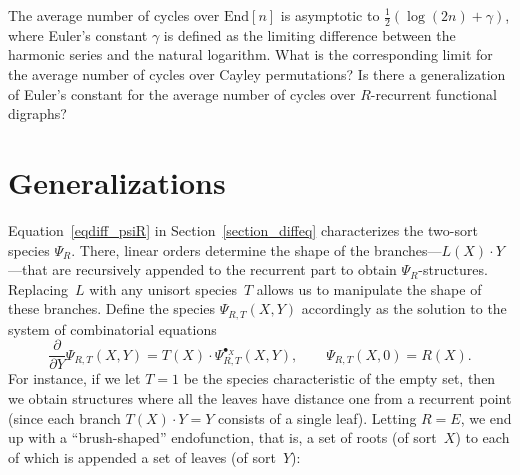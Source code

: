 \documentclass[a4paper,11pt,UKenglish]{article}
\newcommand{\Set}{E}
\newcommand{\Lin}{L}
\newcommand{\End}{\mathrm{End}}
\newcommand{\ddy}[1]{\displaystyle{\frac{\partial{#1}}{\partial Y}}}
\newcommand{\pointX}{^{\bullet_X}}
\newcommand{\Har}[1]{H_{#1}}
\theoremstyle{definition}
\begin{document}
The average number of cycles over $\End[n]$ is asymptotic to
$\frac{1}{2}(\log (2n)+\gamma)$, where Euler's constant $\gamma$
is defined as the limiting difference between the harmonic series
and the natural logarithm.
What is the corresponding limit for the average number of cycles
over Cayley permutations? Is there a generalization of Euler's
constant for the average number of cycles over $R$-recurrent
functional digraphs?

\section{Generalizations}\label{section_generalizations}

Equation~\eqref{eqdiff_psiR} in Section~\ref{section_diffeq}
characterizes the two-sort species $\Psi_R$.
There, linear orders determine the shape of the
branches---$\Lin(X)\cdot Y$---that are recursively appended to the
recurrent part to obtain $\Psi_R$-structures.
Replacing~$\Lin$ with any unisort species~$T$ allows us to manipulate
the shape of these branches. Define the species $\Psi_{R,T}(X,Y)$
accordingly as the solution to the system of combinatorial equations
\[
  \ddy{}\Psi_{R,T}(X,Y) = T(X)\cdot\Psi_{R,T}\pointX(X,Y),\qquad \Psi_{R,T}(X,0)=R(X).
\]
For instance, if we let $T=1$ be the species characteristic of the empty set, then we obtain structures where
all the leaves have distance one from a recurrent point (since each
branch $T(X)\cdot Y=Y$ consists of a single leaf).
Letting $R=\Set$, we end up with a ``brush-shaped'' endofunction,
that is, a set of roots (of sort~$X$) to each of which is appended a set
of leaves (of sort~$Y$):
\end{document}
